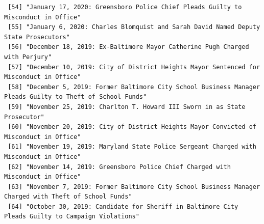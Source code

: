 \documentclass[
  letterpaper,
  DIV=11,
  numbers=noendperiod]{scrreprt}
\begin{document}
\begin{verbatim}
 [54] "January 17, 2020: Greensboro Police Chief Pleads Guilty to Misconduct in Office"                                                                                                                                                                     
 [55] "January 6, 2020: Charles Blomquist and Sarah David Named Deputy State Prosecutors"                                                                                                                                                                   
 [56] "December 18, 2019: Ex-Baltimore Mayor Catherine Pugh Charged with Perjury"                                                                                                                                                                           
 [57] "December 10, 2019: City of District Heights Mayor Sentenced for Misconduct in Office"                                                                                                                                                                
 [58] "December 5, 2019: Former Baltimore City School Business Manager Pleads Guilty to Theft of School Funds"                                                                                                                                              
 [59] "November 25, 2019: Charlton T. Howard III Sworn in as State Prosecutor"                                                                                                                                                                              
 [60] "November 20, 2019: City of District Heights Mayor Convicted of Misconduct in Office"                                                                                                                                                                 
 [61] "November 19, 2019: Maryland State Police Sergeant Charged with Misconduct in Office"                                                                                                                                                                 
 [62] "November 14, 2019: Greensboro Police Chief Charged with Misconduct in Office"                                                                                                                                                                        
 [63] "November 7, 2019: Former Baltimore City School Business Manager Charged with Theft of School Funds"                                                                                                                                                  
 [64] "October 30, 2019: Candidate for Sheriff in Baltimore City Pleads Guilty to Campaign Violations"                                                                                                                                                      

\end{verbatim}
\end{document}
